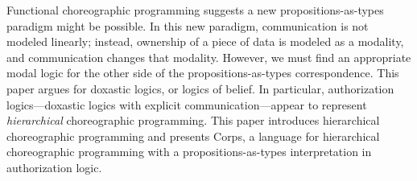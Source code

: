 Functional choreographic programming suggests a new propositions-as-types paradigm might be possible.
In this new paradigm, communication is not modeled linearly; instead, ownership of a piece of data is modeled as a modality, and communication changes that modality.
However, we must find an appropriate modal logic for the other side of the propositions-as-types correspondence.
This paper argues for doxastic logics, or logics of belief.
In particular, authorization logics---doxastic logics with explicit communication---appear to represent \emph{hierarchical} choreographic programming.
This paper introduces hierarchical choreographic programming and presents Corps, a language for hierarchical choreographic programming with a propositions-as-types interpretation in authorization logic.
